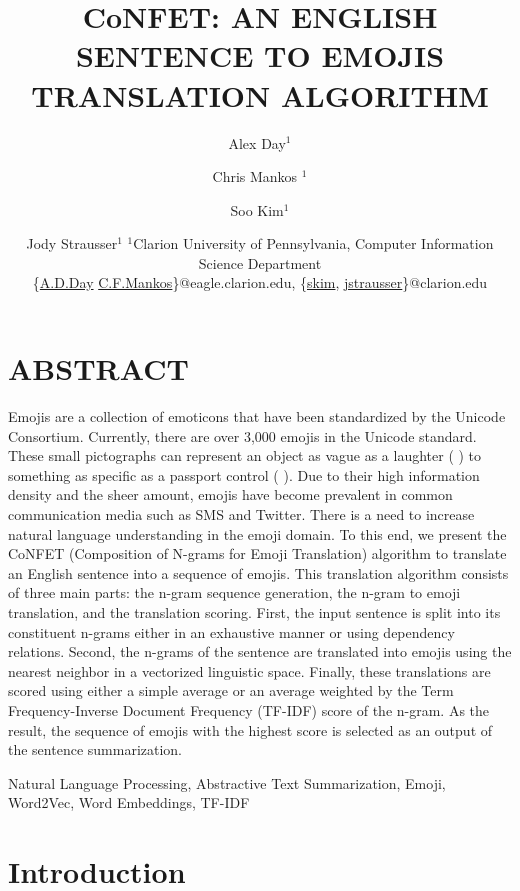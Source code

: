 \documentclass{article}[10]
\author{Alex Day$^1$ \and Chris Mankos $^{1}$ \and Soo Kim$^1$ \and Jody
  Strausser$^{1}$ \affiliations%
  $^1$Clarion University of Pennsylvania, Computer Information Science Department\\
  \emails%
  \{\href{mailto:A.D.Day@eagle.clarion.edu}{A.D.Day}
  \href{mailto:C.F.Mankos@eagle.clarion.edu}{C.F.Mankos}\}@eagle.clarion.edu,
  \{\href{mailto:skim@clarion.edu}{skim},
  \href{mailto:jstrausser@clarion.edu}{jstrausser}\}@clarion.edu }
\newcommand*{\img}[1]{%
  \raisebox{-.3\baselineskip}{%
    \texttt{[image: \#1]}%
  }%
} \title{{CoNFET:} AN ENGLISH SENTENCE TO EMOJIS TRANSLATION ALGORITHM}
\begin{document}
\maketitle

\titleformat{\section}{\normalfont\fontsize{10}{0}\bfseries}{\thesection}{1em}{}

\setlength{\parskip}{0em}
\section*{ABSTRACT}
\setlength{\parskip}{1em}
Emojis are a collection of emoticons that have been
standardized by the Unicode Consortium. Currently, there are over 3,000 emojis
in the Unicode standard. These small pictographs can represent an object as
vague as a laughter (\img{emojis/1f923.png}) to something as specific as a
passport control (\img{emojis/1f6c2.png}). Due to their high information density
and the sheer amount, emojis have become prevalent in common communication media
such as SMS and Twitter. There is a need to increase natural language
understanding in the emoji domain. To this end, we present the CoNFET
(Composition of N-grams for Emoji Translation) algorithm to translate an English
sentence into a sequence of emojis. This translation algorithm consists of three
main parts: the n-gram sequence generation, the n-gram to emoji translation, and
the translation scoring. First, the input sentence is split into its constituent
n-grams either in an exhaustive manner or using dependency relations. Second,
the n-grams of the sentence are translated into emojis using the nearest
neighbor in a vectorized linguistic space. Finally, these translations are
scored using either a simple average or an average weighted by the Term
Frequency-Inverse Document Frequency (TF-IDF) score of the n-gram. As the
result, the sequence of emojis with the highest score is selected as an output
of the sentence summarization.

\begin{keywords}
  Natural Language Processing, Abstractive Text Summarization, Emoji, Word2Vec,
  Word Embeddings, TF-IDF
\end{keywords}

\section{Introduction}
\end{document}

